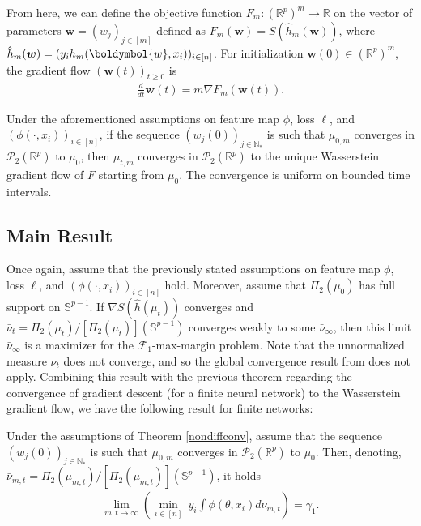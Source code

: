 \documentclass{article}
\newenvironment{manualtheorem}[1]{%
  \renewcommand\themanualtheoreminner{#1}%
  \manualtheoreminner
}{\endmanualtheoreminner}
\newenvironment{manualcorollary}[1]{%
  \renewcommand\themanualcorollaryinner{#1}%
  \manualcorollaryinner
}{\endmanualcorollaryinner}
\begin{document}
From here, we can define the objective function $F_m: (\mathbb{R}^p)^m \rightarrow \mathbb{R}$ on the vector of parameters $\boldsymbol{w} = (w_j)_{j \in [m]}$ defined as $F_m(\boldsymbol{w}) = S(\hat{h}_m(\boldsymbol{w}))$, where $\hat{h}_m(\boldsymbol{w}) = (y_ih_m(\boldymbol{w}, x_i))_{i \in [n]}$. For initialization $\boldsymbol{w}(0) \in (\mathbb{R}^p)^m$, the gradient flow $(\boldsymbol{w}(t))_{t \geq 0}$ is
\begin{align*}
    \frac{d}{dt}\boldsymbol{w}(t) = m \nabla F_m(\boldsymbol{w}(t)).
\end{align*}

\begin{manualtheorem}{2}
Under the aforementioned assumptions on feature map $\phi$, loss $\ell$, and $(\phi(\cdot, x_i))_{i \in [n]}$, if the sequence $(w_j(0))_{j \in \mathbb{N}_*}$ is such that $\mu_{0, m}$ converges in $\mathcal{P}_2(\mathbb{R}^p)$ to $\mu_0$, then $\mu_{t,m}$ converges in $\mathcal{P}_2(\mathbb{R}^p)$ to the unique Wasserstein gradient flow of $F$ starting from $\mu_0$. The convergence is uniform on bounded time intervals.
\end{manualtheorem}

\subsection{Main Result}
\begin{manualtheorem}{3}\label{nondiffconv}
Once again, assume that the previously stated assumptions on feature map $\phi$, loss $\ell$, and $(\phi(\cdot, x_i))_{i \in [n]}$ hold. Moreover, assume that $\Pi_2(\mu_0)$ has full support on $\mathbb{S}^{p-1}$. If $\nabla S(\hat{h}(\mu_t))$ converges and $\bar{\nu}_t = \Pi_2(\mu_t)/[\Pi_2(\mu_t)](\mathbb{S}^{p-1})$ converges weakly to some $\bar{\nu}_{\infty}$, then this limit $\bar{\nu}_{\infty}$ is a maximizer for the $\mathcal{F}_1$-max-margin problem.
\end{manualtheorem}
Note that the unnormalized measure $\nu_t$ does not converge, and so the global convergence result from \cite{chizat2018global} does not apply. Combining this result with the previous theorem regarding the convergence of gradient descent (for a finite neural network) to the Wasserstein gradient flow, we have the following result for finite networks:
\begin{manualcorollary}{4}
Under the assumptions of Theorem \ref{nondiffconv}, assume that the sequence $(w_j(0))_{j \in \mathbb{N}_*}$ is such that $\mu_{0, m}$ converges in $\mathcal{P}_2(\mathbb{R}^p)$ to $\mu_0$. Then, denoting, $\bar{\nu}_{m,t} = \Pi_2(\mu_{m ,t})/ [\Pi_2(\mu_{m, t})](\mathbb{S}^{p-1})$, it holds
\begin{align*}
    \lim_{m, t \rightarrow \infty} \left( \underset{i \in [n]}{\min} \ y_i \int \phi(\theta, x_i) d \bar{\nu}_{m,t} \right) = \gamma_1.
\end{align*}
\end{manualcorollary}
\end{document}
